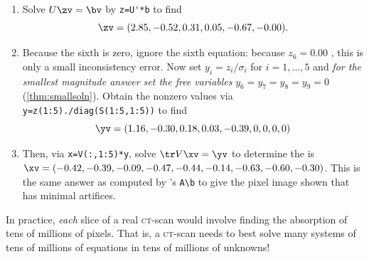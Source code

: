 \begin{example}
\begin{enumerate}
\item Solve \(U\zv=\bv\) by \verb|z=U'*b| to find
\begin{equation*}
\zv=(2.85,-0.52, 0.31, 0.05,-0.67,-0.00).
\end{equation*}

\item Because the sixth  is zero, ignore the sixth equation: because \(z_6=0.00\) \twodp, this is only a small inconsistency error.
Now set $y_i=z_i/\sigma_i$ for \(i=1,\ldots,5\) and \emph{for the smallest magnitude answer set the free variables} \(y_6=y_7=y_8=y_9=0\) (\cref{thm:smallsoln}).
Obtain the nonzero values via \verb|y=z(1:5)./diag(S(1:5,1:5))| to find
\begin{equation*}
\yv=(1.16,-0.30, 0.18, 0.03,-0.39,0,0,0,0)
\end{equation*}

\item%
\begin{figbox}{}%
Then, via \verb|x=V(:,1:5)*y|, solve \(\tr V\xv=\yv\) to determine the  is
\(\sloppy\xv= (-0.42,-0.39,-0.09,-0.47,-0.44,-0.14,-0.63,-0.60,-0.30)\).
This is the same answer as computed by \script[2]'s \verb|A\b| to give the pixel image shown that has minimal artifices.
\reParshape
\end{figbox}

\end{enumerate}

In practice, \emph{each} slice of a real \textsc{ct}-scan would involve finding the absorption of tens of millions of pixels.
That is, a \textsc{ct}-scan needs to best solve many systems of tens of millions of equations in tens of millions of unknowns!
\end{example}



